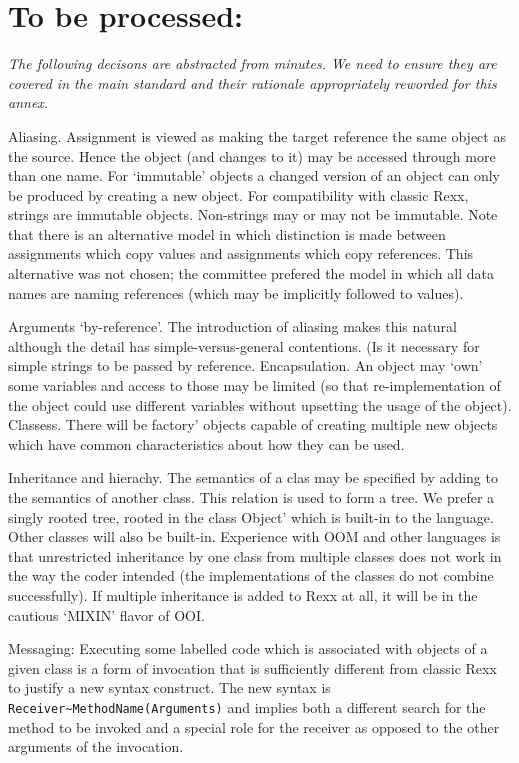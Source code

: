\chapter{To be processed:}\label{to-be-processed}

\emph{The following decisons are abstracted from minutes. We need to
ensure they are covered in the main standard and their rationale
appropriately reworded for this annex.}

Aliasing. Assignment is viewed as making the target reference the same
object as the source. Hence the object (and changes to it) may be
accessed through more than one name. For `immutable' objects a changed
version of an object can only be produced by creating a new object. For
compatibility with classic Rexx, strings are immutable objects.
Non-strings may or may not be immutable. Note that there is an
alternative model in which distinction is made between assignments which
copy values and assignments which copy references. This alternative was
not chosen; the committee prefered the model in which all data names are
naming references (which may be implicitly followed to values).

Arguments `by-reference'. The introduction of aliasing makes this
natural although the detail has simple-versus-general contentions. (Is
it necessary for simple strings to be passed by reference.
Encapsulation. An object may `own' some variables and access to those
may be limited (so that re-implementation of the object could use
different variables without upsetting the usage of the object).
Classess. There will be factory' objects capable of creating multiple
new objects which have common characteristics about how they can be
used.

Inheritance and hierachy. The semantics of a clas may be specified by
adding to the semantics of another class. This relation is used to form
a tree. We prefer a singly rooted tree, rooted in the class Object'
which is built-in to the language. Other classes will also be built-in.
Experience with OOM and other languages is that unrestricted inheritance
by one class from multiple classes does not work in the way the coder
intended (the implementations of the classes do not combine
successfully). If multiple inheritance is added to Rexx at all, it will
be in the cautious `MIXIN' flavor of OOI.

Messaging: Executing some labelled code which is associated with objects
of a given class is a form of invocation that is sufficiently different
from classic Rexx to justify a new syntax construct. The new syntax is
\texttt{Receiver\textasciitilde{}MethodName(Arguments)} and implies both
a different search for the method to be invoked and a special role for
the receiver as opposed to the other arguments of the invocation.

